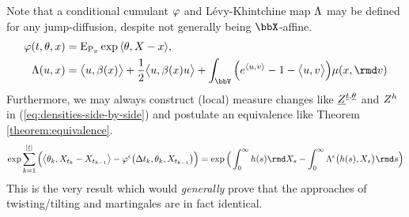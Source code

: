 \begin{remark}
  Note that a conditional cumulant $\varphi$ and L\'evy-Khintchine map $\Lambda$ may be defined for any jump-diffusion, despite not generally being $\stateSpace$-affine.
  \begin{align*}
    \affShift(t, \twistVar, \stateVar) &= \Exp_{\Prb_\stateVar}\exp\prj{\twistVar}{\X-\stateVar}, \\
    \ode(\momentVar, \stateVar) &= \bprj{\momentVar}{\affDrift(\stateVar)} + \frac12\bprj{\momentVar}{\affDrift(\stateVar)\momentVar} + \int_\vecSpace \Big( e^\prj{\momentVar}{\markVar} - 1 - \bprj{\momentVar}{\markVar} \Big) \affJump(\stateVar, \rmd\markVar)
  \end{align*}
  Furthermore, we may always construct (local) measure changes like $\underline{Z}^{\underline t, \underline{\theta}}$ and $Z^{h}$ in (\ref{eq:densities-side-by-side}) and postulate an equivalence like Theorem \ref{theorem:equivalence}.
  \begin{equation*}
    \exp \sum_{k=1}^{|\underline t|}\Big( \bprj{\twistVar_k}{\X_{t_k}-\X_{t_{k-1}}} - \affShift^\epsilon\big(\Delta t_k, \twistVar_k, \X_{t_{k-1}} \big) \Big) 
    = \exp\Big( \int_0^\infty \twistFunc(s) \rmd \X_s - \int_0^\infty \ode^\epsilon\big(\twistFunc(s), \X_s\big) \rmd s \Big)
  \end{equation*}
  This is the very result which would \emph{generally} prove that the approaches of twisting/tilting and martingales are in fact identical.
\end{remark}
